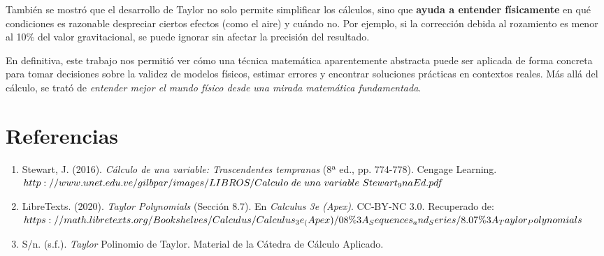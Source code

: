 \documentclass{article}
\begin{document}
También se mostró que el desarrollo de Taylor no solo permite simplificar los cálculos, sino que \textbf{ayuda a entender físicamente} en qué condiciones es razonable despreciar ciertos efectos (como el aire) y cuándo no. Por ejemplo, si la corrección debida al rozamiento es menor al 10\% del valor gravitacional, se puede ignorar sin afectar la precisión del resultado.

En definitiva, este trabajo nos permitió ver cómo una técnica matemática aparentemente abstracta puede ser aplicada de forma concreta para tomar decisiones sobre la validez de modelos físicos, estimar errores y encontrar soluciones prácticas en contextos reales. Más allá del cálculo, se trató de \textit{entender mejor el mundo físico desde una mirada matemática fundamentada}.

\section{Referencias}
\begin{enumerate}
\item Stewart, J. (2016). \textit{Cálculo de una variable: Trascendentes tempranas} (8ª ed., pp. 774-778). Cengage Learning. $http://www.unet.edu.ve/gilbpar/images/LIBROS/Calculo\ de\ una\ variable\\\ Stewart_9naEd.pdf$
\item LibreTexts. (2020). \textit{Taylor Polynomials} (Sección 8.7). En \textit{Calculus 3e (Apex)}. CC‑BY‑NC 3.0. Recuperado de: $https://math.libretexts.org/Bookshelves/Calculus/Calculus_3e_(Apex)/08\%3\\A_Sequences_and_Series/8.07\%3A_Taylor_Polynomials$
\item S/n. (s.f.). \textit{Taylor} Polinomio de Taylor. Material de la Cátedra de Cálculo Aplicado.

\end{enumerate}
\end{document}
